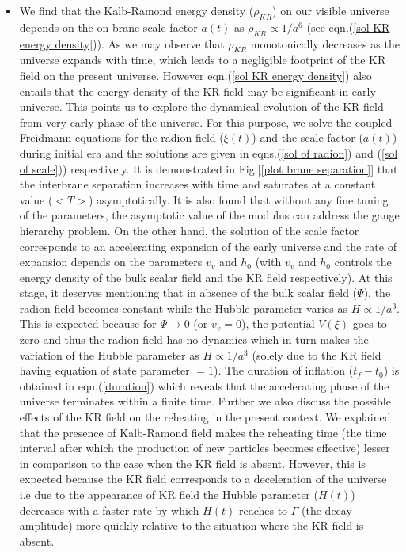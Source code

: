 \documentclass[a4paper]{article}
\begin{document}
\begin{itemize}
 \item We find that the Kalb-Ramond energy density ($\rho_{KR}$) on our visible universe depends on the on-brane scale factor $a(t)$ as 
 $\rho_{KR} \propto 1/a^6$ (see eqn.(\ref{sol KR energy density})). As we may observe that $\rho_{KR}$ monotonically decreases 
 as the universe expands with time, which leads 
 to a negligible footprint of the KR field on the present universe. However eqn.(\ref{sol KR energy density}) also entails 
 that the energy density of the KR field may be significant in early universe. This points us to explore the dynamical evolution of the 
 KR field from very early phase of the universe. For this purpose, we solve the coupled Freidmann equations 
 for the radion field ($\xi(t)$) and the scale factor ($a(t)$) during initial era and the solutions are given in 
 eqns.(\ref{sol of radion}) and (\ref{sol of scale})) respectively. 
 It is demonstrated in Fig.[\ref{plot brane separation}] that the interbrane separation increases 
 with time and saturates at a constant value ($<T>$) asymptotically. 
 It is also found that without any fine tuning of the parameters, the asymptotic value of the modulus can address the gauge hierarchy problem. 
 On the other hand, the solution of the scale factor corresponds to an accelerating 
 expansion of the early universe and the rate of expansion depends on the parameters $v_v$ and $h_0$ (with $v_v$ and $h_0$ controls 
 the energy density of the bulk scalar field and the KR field respectively). At this stage, it deserves mentioning that 
 in absence of the bulk scalar field ($\Psi$), the radion field becomes constant while the Hubble parameter varies as $H \propto 1/a^3$. 
 This is expected because for $\Psi \rightarrow 0$ (or $v_v = 0$), the potential $V(\xi)$ goes to zero and thus the radion field has 
 no dynamics which in turn makes the variation of the Hubble parameter as $H \propto 1/a^3$ (solely due to the KR field having 
 equation of state parameter $=1$). The duration of inflation ($t_f-t_0$) is obtained in eqn.(\ref{duration}) which 
 reveals that the accelerating phase of the universe terminates within a finite time. Further we also discuss the possible effects of 
 the KR field on the reheating in the present context. We explained that the presence of Kalb-Ramond field makes the reheating time (the time interval after 
 which the production of new particles becomes effective) lesser in comparison to the case when the KR field is absent. However, this is expected 
 because the KR field corresponds to a deceleration of the universe i.e due to the appearance of KR field the Hubble parameter ($H(t)$) 
 decreases with a faster rate by which $H(t)$ reaches to $\Gamma$ (the decay amplitude) more quickly relative to the situation 
 where the KR field is absent.
 

\end{itemize}
\end{document}
